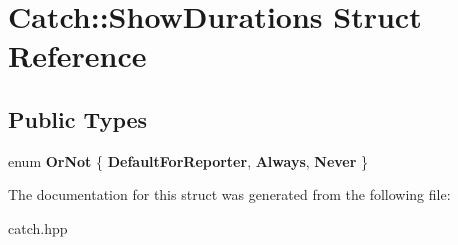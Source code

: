 \hypertarget{structCatch_1_1ShowDurations}{}\section{Catch\+::Show\+Durations Struct Reference}
\label{structCatch_1_1ShowDurations}
\subsection*{Public Types}
\begin{DoxyCompactItemize}
\item 
\mbox{\label{structCatch_1_1ShowDurations_a82fa0174554187220c1eda175f122ee1}} 
enum {\bfseries Or\+Not} \{ {\bfseries Default\+For\+Reporter}, 
{\bfseries Always}, 
{\bfseries Never}
 \}
\end{DoxyCompactItemize}


The documentation for this struct was generated from the following file\+:\begin{DoxyCompactItemize}
\item 
catch.\+hpp\end{DoxyCompactItemize}
